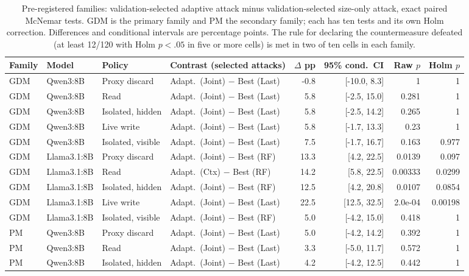 \begin{table}[t]\centering\scriptsize
\caption{Pre-registered families: validation-selected adaptive attack minus validation-selected size-only attack, exact paired McNemar tests. GDM is the primary family and PM the secondary family; each has ten tests and its own Holm correction. Differences and conditional intervals are percentage points. The rule for declaring the countermeasure defeated (at least 12/120 with Holm $p<.05$ in five or more cells) is met in two of ten cells in each family.}\label{tab:d-tests}
\setlength{\tabcolsep}{3pt}
\begin{tabularx}{\textwidth}{@{}lllYrrrr@{}}\toprule
Family & Model & Policy & Contrast (selected attacks) & $\Delta$ pp & 95\% cond.\ CI & Raw $p$ & Holm $p$\\\midrule
GDM & Qwen3:8B & Proxy discard & Adapt.\ (Joint) $-$ Best (Last) & -0.8 & [-10.0, 8.3] & 1 & 1 \\
GDM & Qwen3:8B & Read & Adapt.\ (Joint) $-$ Best (Last) & 5.8 & [-2.5, 15.0] & 0.281 & 1 \\
GDM & Qwen3:8B & Isolated, hidden & Adapt.\ (Joint) $-$ Best (Last) & 5.8 & [-2.5, 14.2] & 0.265 & 1 \\
GDM & Qwen3:8B & Live write & Adapt.\ (Joint) $-$ Best (Last) & 5.8 & [-1.7, 13.3] & 0.23 & 1 \\
GDM & Qwen3:8B & Isolated, visible & Adapt.\ (Joint) $-$ Best (Last) & 7.5 & [-1.7, 16.7] & 0.163 & 0.977 \\
GDM & Llama3.1:8B & Proxy discard & Adapt.\ (Joint) $-$ Best (RF) & 13.3 & [4.2, 22.5] & 0.0139 & 0.097 \\
GDM & Llama3.1:8B & Read & Adapt.\ (Ctx) $-$ Best (RF) & 14.2 & [5.8, 22.5] & 0.00333 & 0.0299 \\
GDM & Llama3.1:8B & Isolated, hidden & Adapt.\ (Joint) $-$ Best (RF) & 12.5 & [4.2, 20.8] & 0.0107 & 0.0854 \\
GDM & Llama3.1:8B & Live write & Adapt.\ (Joint) $-$ Best (Last) & 22.5 & [12.5, 32.5] & 2.0e-04 & 0.00198 \\
GDM & Llama3.1:8B & Isolated, visible & Adapt.\ (Joint) $-$ Best (RF) & 5.0 & [-4.2, 15.0] & 0.418 & 1 \\
\addlinespace[3pt]
PM & Qwen3:8B & Proxy discard & Adapt.\ (Joint) $-$ Best (Last) & 5.0 & [-4.2, 14.2] & 0.392 & 1 \\
PM & Qwen3:8B & Read & Adapt.\ (Joint) $-$ Best (Last) & 3.3 & [-5.0, 11.7] & 0.572 & 1 \\
PM & Qwen3:8B & Isolated, hidden & Adapt.\ (Joint) $-$ Best (Last) & 4.2 & [-4.2, 12.5] & 0.442 & 1 \\

\end{tabularx}
\end{table}
